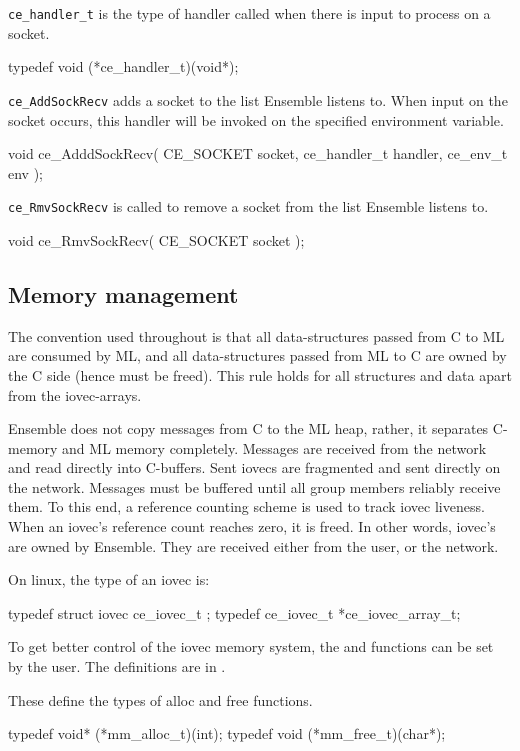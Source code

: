 {\tt ce\_handler\_t} is the type of handler called when there is input
to process on a socket.
\begin{codebox}
typedef void (*ce_handler_t)(void*);
\end{codebox}

{\tt ce\_AddSockRecv} adds a socket to the list Ensemble listens to. 
When input on the socket occurs, this handler will be invoked
on the specified environment variable.
\begin{codebox}
void ce_AdddSockRecv(
    CE_SOCKET socket,
    ce_handler_t handler,
    ce_env_t env
);
\end{codebox}

{\tt ce\_RmvSockRecv} is called to remove a socket from the list 
Ensemble listens to.
\begin{codebox}
void ce_RmvSockRecv(
    CE_SOCKET socket
);
\end{codebox}


\subsection{Memory management}
The convention used throughout is that all
data-structures passed from C to ML are consumed by ML, and all
data-structures passed from ML to C are owned by the C side (hence
must be freed). This rule holds for all structures and data apart from 
the iovec-arrays.

Ensemble does not copy messages from C to the ML heap, rather, it
separates C-memory and ML memory completely. Messages are received
from the network and read directly into C-buffers. Sent iovecs are
fragmented and sent directly on the network. Messages must be buffered
until all group members reliably receive them. To this end, a
reference counting scheme is used to track iovec liveness. When an
iovec's reference count reaches zero, it is freed. In other words,
iovec's are owned by Ensemble. They are received either from the 
user, or the network.

On linux, the type of an iovec is:
\begin{codebox}
typedef struct iovec ce_iovec_t ;
typedef ce_iovec_t *ce_iovec_array_t;
\end{codebox}

To get better control of the iovec memory system, the  and 
 functions can be set by the user. The definitions are in
.

These define the types of alloc and free functions.
\begin{codebox}
typedef void* (*mm_alloc_t)(int);
typedef void  (*mm_free_t)(char*);
\end{codebox}

